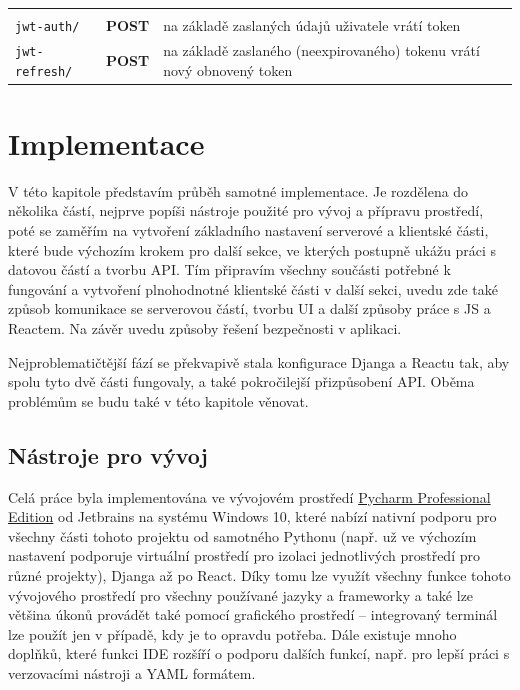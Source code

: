             {\centering
            \begin{tabular}{p{\apiA\textwidth} p{\apiB\textwidth} p{\apiC\textwidth}}&&\\
                \verb|jwt-auth/|            & \textbf{POST}     & na základě zaslaných údajů uživatele vrátí token\\
                \verb|jwt-refresh/|         & \textbf{POST}     & na základě zaslaného (neexpirovaného) tokenu vrátí nový obnovený token\\
            \end{tabular}}
            
    
\chapter{Implementace}\label{implementace}
V této kapitole představím průběh samotné implementace. Je rozdělena do několika částí, nejprve popíši nástroje použité pro vývoj a přípravu prostředí, poté se zaměřím na vytvoření základního nastavení serverové a klientské části, které bude výchozím krokem pro další sekce, ve kterých postupně ukážu práci s datovou částí a tvorbu API. Tím připravím všechny součásti potřebné k fungování a vytvoření plnohodnotné klientské části v další sekci, uvedu zde také způsob komunikace se serverovou částí, tvorbu UI a další způsoby práce s JS a Reactem. Na závěr uvedu způsoby řešení bezpečnosti v aplikaci.

Nejproblematičtější fází se překvapivě stala konfigurace Djanga a Reactu tak, aby spolu tyto dvě části fungovaly, a také pokročilejší přizpůsobení API. Oběma problémům se budu také v této kapitole věnovat.

    \section{Nástroje pro vývoj}\label{nastrojeprovyvoj}
    Celá práce byla implementována ve vývojovém prostředí \href{https://www.jetbrains.com/pycharm/}{Pycharm Professional Edition} od Jetbrains na systému Windows 10, které nabízí nativní podporu pro všechny části tohoto projektu od samotného Pythonu (např. už ve výchozím nastavení podporuje virtuální prostředí pro izolaci jednotlivých prostředí pro různé projekty), Djanga až po React. Díky tomu lze využít všechny funkce tohoto vývojového prostředí pro všechny používané jazyky a frameworky a také lze většina úkonů provádět také pomocí grafického prostředí -- integrovaný terminál lze použít jen v případě, kdy je to opravdu potřeba. Dále existuje mnoho doplňků, které funkci IDE rozšíří o podporu dalších funkcí, např. pro lepší práci s verzovacími nástroji a YAML formátem.
    
